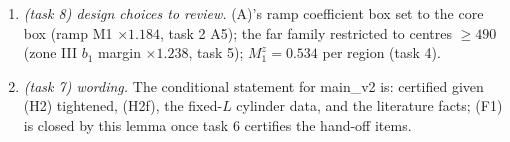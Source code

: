\documentclass[11pt]{article}
\theoremstyle{definition}\newtheorem{definition}[theorem]{Definition}
\theoremstyle{remark}\newtheorem{remark}[theorem]{Remark}
\begin{document}
\begin{enumerate}[label=(G\arabic*),leftmargin=2.6em,itemsep=2pt]
\item \emph{(task 8) design choices to review.} (A)'s ramp coefficient box set to the core box (ramp M1 $\times1.184$, task 2 A5); the far family restricted to centres $\ge490$ (zone III $b_1$ margin $\times1.238$, task 5); $M_1^z=0.534$ per region (task 4).
\item \emph{(task 7) wording.} The conditional statement for main\_v2 is: certified given (H2) tightened, (H2f), the fixed-$L$ cylinder data, and the literature facts; (F1) is closed by this lemma once task 6 certifies the hand-off items.
\end{enumerate}
\end{document}
